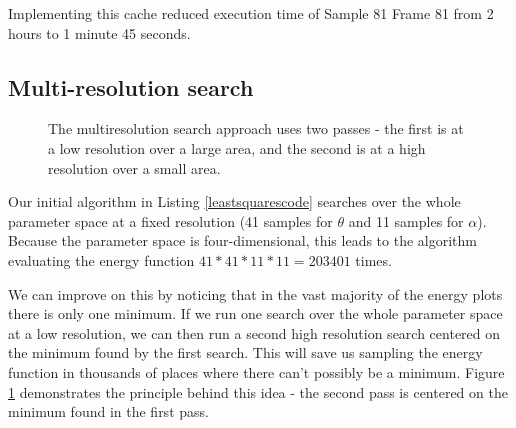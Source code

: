Implementing this cache reduced execution time of Sample 81 Frame 81 from 2 hours to 1 minute 45 seconds.

\subsection{Multi-resolution search}
\label{Design:MultiRes}

\begin{figure}[tb]
	\centering
	\qquad
	\caption{The multiresolution search approach uses two passes - the first is at a low resolution over a large area,
		and the second is at a high resolution over a small area.}
	\label{MultiResImages}
\end{figure}

Our initial algorithm in Listing \ref{leastsquarescode} searches over the whole parameter space at a fixed resolution (41 samples for $\theta$ and 11 samples for $\alpha$).
Because the parameter space is four-dimensional, this leads to the algorithm evaluating the energy function $41*41*11*11 = 203401$ times.

We can improve on this by noticing that in the vast majority of the energy plots there is only one minimum.
If we run one search over the whole parameter space at a low resolution, we can then run a second high resolution search centered on the minimum found by the first search.
This will save us sampling the energy function in thousands of places where there can't possibly be a minimum.
Figure \ref{MultiResImages} demonstrates the principle behind this idea - the second pass is centered on the minimum found in the first pass.

